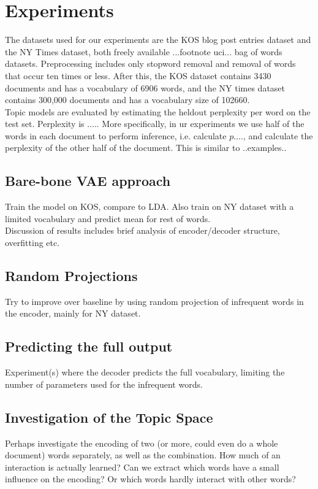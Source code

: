 \chapter{Experiments}

The datasets used for our experiments are the KOS blog post entries dataset and the NY Times dataset, both freely available ...footnote uci... bag of words datasets. Preprocessing includes only stopword removal and removal of words that occur ten times or less. After this, the KOS dataset contains 3430 documents and has a vocabulary of 6906 words, and the NY times dataset contains 300,000 documents and has a vocabulary size of 102660. \\
Topic models are evaluated by estimating the heldout perplexity per word on the test set. Perplexity is ..... More specifically, in ur experiments we use half of the words in each document to perform inference, i.e. calculate $p....$, and calculate the perplexity of the other half of the document. This is similar to ..examples..

\section{Bare-bone VAE approach}

Train the model on KOS, compare to LDA. Also train on NY dataset with a limited vocabulary and predict mean for rest of words. \\
Discussion of results includes brief analysis of encoder/decoder structure, overfitting etc.

\section{Random Projections}
Try to improve over baseline by using random projection of infrequent words in the encoder, mainly for NY dataset.

\section{Predicting the full output}
Experiment(s) where the decoder predicts the full vocabulary, limiting the number of parameters used for the infrequent words.

\section{Investigation of the Topic Space}
Perhaps investigate the encoding of two (or more, could even do a whole document) words separately, as well as the combination. How much of an interaction is actually learned? Can we extract which words have a small influence on the encoding? Or which words hardly interact with other words?

